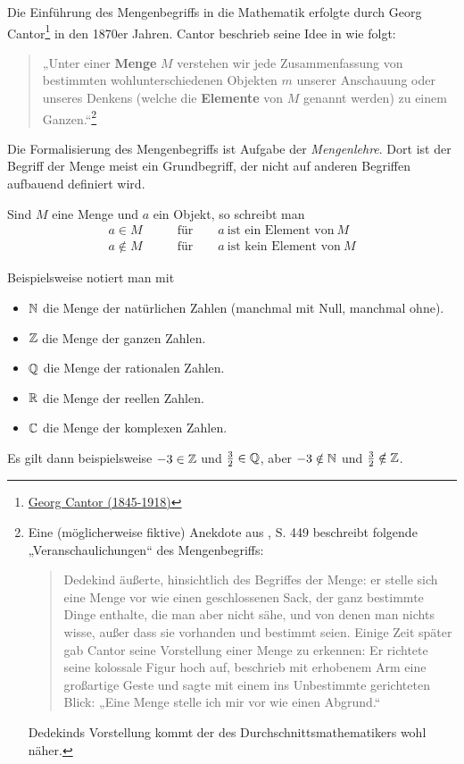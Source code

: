 \begin{defin} \label{mengenimlogikkapitel}
    Die Einführung des Mengenbegriffs in die Mathematik erfolgte durch Georg Cantor\footnote{\href{https://de.wikipedia.org/wiki/Georg_Cantor}{Georg Cantor (1845-1918)}} in den 1870er Jahren. Cantor beschrieb seine Idee in \cite{Can95} wie folgt:
    \begin{quote}
        „Unter einer \textbf{Menge} $M$ verstehen wir jede Zusammenfassung von bestimmten wohlunterschiedenen Objekten $m$ unserer Anschauung oder unseres Denkens (welche die \textbf{Elemente} von $M$ genannt werden) zu einem Ganzen.“\footnote{Eine (möglicherweise fiktive) Anekdote aus \cite{Ded32}, S. 449 beschreibt folgende „Veranschaulichungen“ des Mengenbegriffs:
    \begin{quote}
        Dedekind äußerte, hinsichtlich des Begriffes der Menge: er stelle sich eine Menge vor wie einen geschlossenen Sack, der ganz bestimmte Dinge enthalte, die man aber nicht sähe, und von denen man nichts wisse, außer dass sie vorhanden und bestimmt seien. Einige Zeit später gab Cantor seine Vorstellung einer Menge zu erkennen: Er richtete seine kolossale Figur hoch auf, beschrieb mit erhobenem Arm eine großartige Geste und sagte mit einem ins Unbestimmte gerichteten Blick: „Eine Menge stelle ich mir vor wie einen Abgrund.“
    \end{quote}
    Dedekinds Vorstellung kommt der des Durchschnittsmathematikers wohl näher.}
    \end{quote}
    Die Formalisierung des Mengenbegriffs ist Aufgabe der \emph{Mengenlehre}. Dort ist der Begriff der Menge meist ein Grundbegriff, der nicht auf anderen Begriffen aufbauend definiert wird.
\end{defin}


\begin{nota}[Elementzeichen]
    Sind $M$ eine Menge und $a$ ein Objekt, so schreibt man
    \begin{align*}
        a\in M\qquad&\text{für}\qquad a\ \text{ist ein Element von}\ M \\
        a\notin M\qquad&\text{für}\qquad a\ \text{ist kein Element von}\ M
    \end{align*}
\end{nota}


\begin{bsp}[Zahlbereiche]
    Beispielsweise notiert man mit
    \begin{itemize}
        \item $\mathbb N$ die Menge der natürlichen Zahlen (manchmal mit Null, manchmal ohne).
        \item $\mathbb Z$ die Menge der ganzen Zahlen.
        \item $\mathbb Q$ die Menge der rationalen Zahlen.
        \item $\mathbb R$ die Menge der reellen Zahlen.
        \item $\mathbb C$ die Menge der komplexen Zahlen.
    \end{itemize}
    Es gilt dann beispielsweise $-3\in \mathbb Z$ und $\frac{3}{2}\in\mathbb Q$, aber $-3\notin \mathbb N$ und $\frac{3}{2}\notin \mathbb Z$.
\end{bsp}


